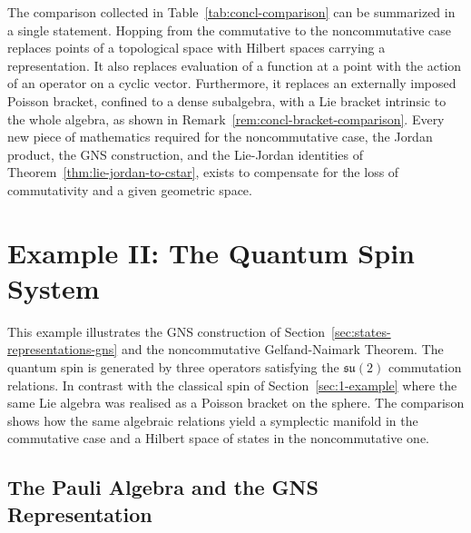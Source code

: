	\noindent The comparison collected in Table~\ref{tab:concl-comparison} can be summarized in a single statement. Hopping from the commutative to the noncommutative case replaces points of a topological space with Hilbert spaces carrying a representation. It also replaces evaluation of a function at a point with the action of an operator on a cyclic vector. Furthermore, it replaces an externally imposed Poisson bracket, confined to a dense subalgebra, with a Lie bracket intrinsic to the whole algebra, as shown in Remark~\ref{rem:concl-bracket-comparison}. Every new piece of mathematics required for the noncommutative case, the Jordan product, the GNS construction, and the Lie-Jordan identities of Theorem~\ref{thm:lie-jordan-to-cstar}, exists to compensate for the loss of commutativity and a given geometric space.
	
	\section{Example II: The Quantum Spin System}
	\label{sec:2-example}
	
	This example illustrates the GNS construction of Section~\ref{sec:states-representations-gns} and the noncommutative Gelfand-Naimark Theorem. The quantum spin is generated by three operators satisfying the $\mathfrak{su}(2)$ commutation relations. In contrast with the classical spin of Section~\ref{sec:1-example} where the same Lie algebra was realised as a Poisson bracket on the sphere. The comparison shows how the same algebraic relations yield a symplectic manifold in the commutative case and a Hilbert space of states in the noncommutative one.
 	
 	\subsection*{The Pauli Algebra and the GNS Representation}
 	

